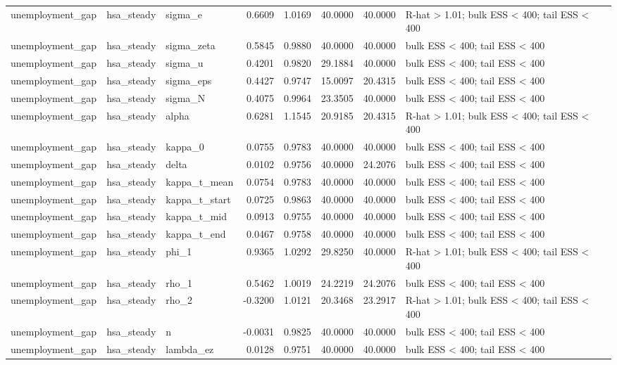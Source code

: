 \begin{tabular}{lllrrrrl}
unemployment\_gap & hsa\_steady & sigma\_e & 0.6609 & 1.0169 & 40.0000 & 40.0000 & R-hat > 1.01; bulk ESS < 400; tail ESS < 400 \\
unemployment\_gap & hsa\_steady & sigma\_zeta & 0.5845 & 0.9880 & 40.0000 & 40.0000 & bulk ESS < 400; tail ESS < 400 \\
unemployment\_gap & hsa\_steady & sigma\_u & 0.4201 & 0.9820 & 29.1884 & 40.0000 & bulk ESS < 400; tail ESS < 400 \\
unemployment\_gap & hsa\_steady & sigma\_eps & 0.4427 & 0.9747 & 15.0097 & 20.4315 & bulk ESS < 400; tail ESS < 400 \\
unemployment\_gap & hsa\_steady & sigma\_N & 0.4075 & 0.9964 & 23.3505 & 40.0000 & bulk ESS < 400; tail ESS < 400 \\
unemployment\_gap & hsa\_steady & alpha & 0.6281 & 1.1545 & 20.9185 & 20.4315 & R-hat > 1.01; bulk ESS < 400; tail ESS < 400 \\
unemployment\_gap & hsa\_steady & kappa\_0 & 0.0755 & 0.9783 & 40.0000 & 40.0000 & bulk ESS < 400; tail ESS < 400 \\
unemployment\_gap & hsa\_steady & delta & 0.0102 & 0.9756 & 40.0000 & 24.2076 & bulk ESS < 400; tail ESS < 400 \\
unemployment\_gap & hsa\_steady & kappa\_t\_mean & 0.0754 & 0.9783 & 40.0000 & 40.0000 & bulk ESS < 400; tail ESS < 400 \\
unemployment\_gap & hsa\_steady & kappa\_t\_start & 0.0725 & 0.9863 & 40.0000 & 40.0000 & bulk ESS < 400; tail ESS < 400 \\
unemployment\_gap & hsa\_steady & kappa\_t\_mid & 0.0913 & 0.9755 & 40.0000 & 40.0000 & bulk ESS < 400; tail ESS < 400 \\
unemployment\_gap & hsa\_steady & kappa\_t\_end & 0.0467 & 0.9758 & 40.0000 & 40.0000 & bulk ESS < 400; tail ESS < 400 \\
unemployment\_gap & hsa\_steady & phi\_1 & 0.9365 & 1.0292 & 29.8250 & 40.0000 & R-hat > 1.01; bulk ESS < 400; tail ESS < 400 \\
unemployment\_gap & hsa\_steady & rho\_1 & 0.5462 & 1.0019 & 24.2219 & 24.2076 & bulk ESS < 400; tail ESS < 400 \\
unemployment\_gap & hsa\_steady & rho\_2 & -0.3200 & 1.0121 & 20.3468 & 23.2917 & R-hat > 1.01; bulk ESS < 400; tail ESS < 400 \\
unemployment\_gap & hsa\_steady & n & -0.0031 & 0.9825 & 40.0000 & 40.0000 & bulk ESS < 400; tail ESS < 400 \\
unemployment\_gap & hsa\_steady & lambda\_ez & 0.0128 & 0.9751 & 40.0000 & 40.0000 & bulk ESS < 400; tail ESS < 400 \\

\end{tabular}
